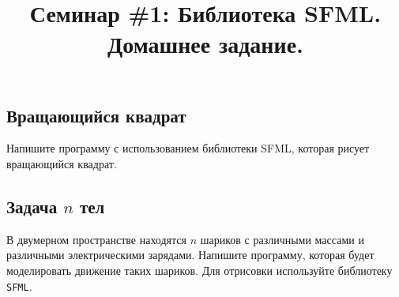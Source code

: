 \documentclass{article}
\begin{document}
\title{Семинар \#1: Библиотека SFML. Домашнее задание.\vspace{-5ex}}\date{}\maketitle

\subsection{Вращающийся квадрат}
Напишите программу с использованием библиотеки SFML, которая рисует вращающийся квадрат.

\subsection{Задача $n$ тел}
В двумерном пространстве находятся $n$ шариков с различными массами и различными электрическими зарядами. Напишите программу, которая будет моделировать движение таких шариков. Для отрисовки используйте библиотеку \texttt{SFML}.\\
\end{document}
